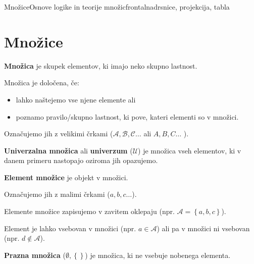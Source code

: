\begin{priprava}{7}{}{Množice}{Osnove logike in teorije množic}{frontalna}{drsnice, projekcija, tabla}


     
    \section{Množice}
        
    \textbf{Množica} je skupek elementov, ki imajo neko skupno lastnost.


    Množica je določena, če:
    \begin{itemize}
        \item lahko naštejemo vse njene elemente ali
        \item poznamo pravilo/skupno lastnost, ki pove, kateri elementi so v množici.
    \end{itemize}

    Označujemo jih z velikimi črkami ($\mathcal{A}, \mathcal{B}, \mathcal{C} \dots$ ali  
    $A, B, C \dots$ ). 
    \newline

    \textbf{Univerzalna množica} ali \textbf{univerzum} ($\mathcal{U}$) je množica 
    vseh elementov, ki v danem primeru nastopajo oziroma jih opazujemo.
    \newline

    \textbf{Element množice} je objekt v množici. 

    Označujemo jih z malimi črkami ($a, b, c \dots$). 

    Elemente množice zapisujemo v zavitem oklepaju (npr. $\mathcal{A}=\left\{a, b, c\right\}$).

    Element je lahko vsebovan v množici (npr. $a\in\mathcal{A}$) ali pa 
    v množici ni vsebovan (npr. $d\notin\mathcal{A}$).
    \newline

    \textbf{Prazna množica} ($\mathbf{\emptyset, \left\{\right\}}$) je množica, 
    ki ne vsebuje nobenega elementa.



\end{priprava}